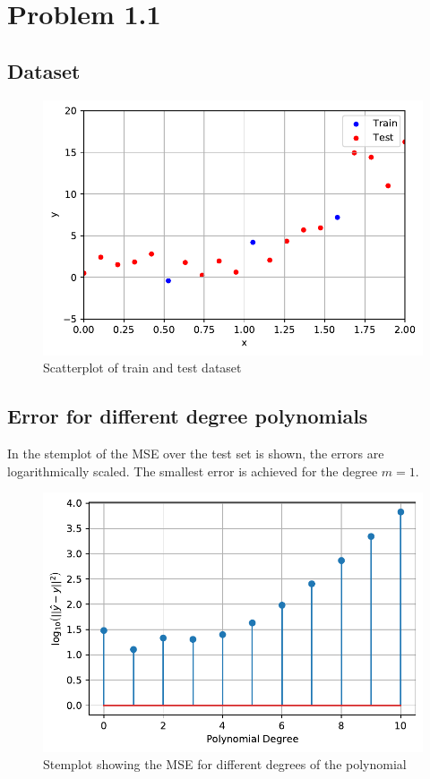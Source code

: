 \documentclass[12pt,a4paper]{scrartcl}
\begin{document}
	\section*{Problem 1.1}
	
	\subsection*{Dataset}
	\begin{figure}[H]
		\centering	\includegraphics[width=0.85\linewidth]{figs/ex1_1_data.pdf}
		\caption{Scatterplot of train and test dataset}
		\label{fig:ex1_1_data}
	\end{figure}

	\subsection*{Error for different degree polynomials}
	
	In  the stemplot of the MSE over the test set is shown, the errors are logarithmically scaled. The smallest error is achieved for the degree $m=1$.
	
	\begin{figure}[H]
		\centering	\includegraphics[width=0.85\linewidth]{figs/ex1_1_mse_degree.pdf}
		\caption{Stemplot showing the MSE for different degrees of the polynomial}
		\label{fig:ex1_1_mse_deg}
	\end{figure}
\end{document}
